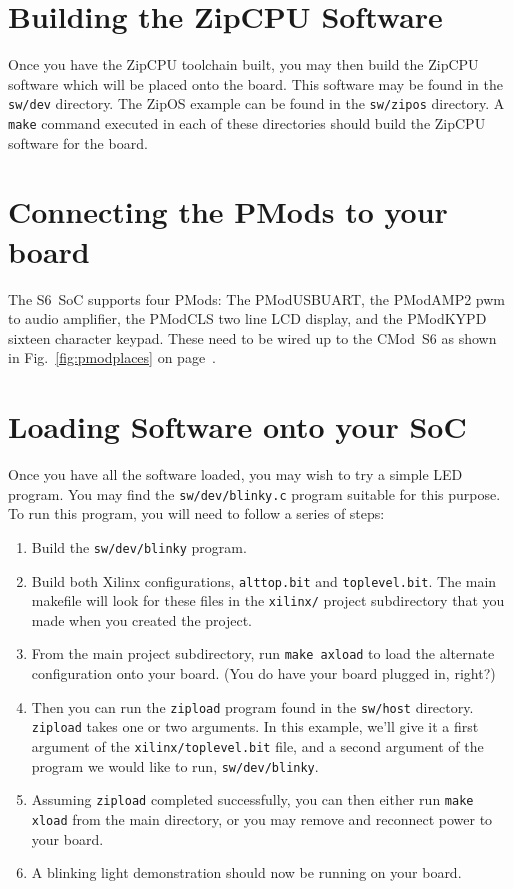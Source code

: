\documentclass{gqtekspec}
\begin{document}
\section{Building the ZipCPU Software}

Once you have the ZipCPU toolchain built, you may then build the ZipCPU software
which will be placed onto the board.  This software may be found in the
{\tt sw/dev} directory.  The ZipOS example can be found in the {\tt sw/zipos}
directory.  A {\tt make} command executed in each of these directories should
build the ZipCPU software for the board.

\section{Connecting the PMods to your board}
The S6~SoC supports four PMods: The PModUSBUART, the PModAMP2 pwm to audio
amplifier, the PModCLS two line LCD display, and the PModKYPD sixteen 
character keypad.  These need to be wired up to the CMod~S6 as shown in 
Fig.~\ref{fig:pmodplaces} on page~\pageref{fig:pmodplaces}.

\section{Loading Software onto your SoC}
Once you have all the software loaded, you may wish to try a simple LED
program.  You may find the {\tt sw/dev/blinky.c} program suitable for this
purpose.  To run this program, you will need to follow a series of steps:
\begin{enumerate}
\item Build the {\tt sw/dev/blinky} program.
\item Build both Xilinx configurations, {\tt alttop.bit} and {\tt toplevel.bit}.
	The main makefile will look for these files in the {\tt xilinx/}
	project subdirectory that you made when you created the project.
\item From the main project subdirectory, run {\tt make axload} to load
	the alternate configuration onto your board.  (You do have your board
	plugged in, right?)
\item Then you can run the {\tt zipload} program found in the {\tt sw/host}
	directory.  {\tt zipload} takes one or two arguments.  In this
	example, we'll give it a first argument of the {\tt xilinx/toplevel.bit}
	file, and a second argument of the program we would like to run,
	{\tt sw/dev/blinky}.
\item Assuming {\tt zipload} completed successfully, you can then either run
	{\tt make xload} from the main directory, or you may remove and
	reconnect power to your board.
\item A blinking light demonstration should now be running on your board.
\end{enumerate}
\end{document}
